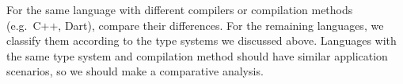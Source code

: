 
For the same language with different compilers or compilation methods (e.g.\ C++, Dart), compare their differences.
For the remaining languages, we classify them according to the type systems we discussed above.
Languages with the same type system and compilation method should have similar application scenarios,
so we should make a comparative analysis.





